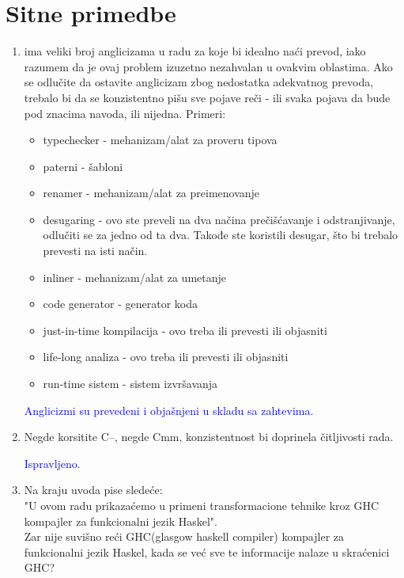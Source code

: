 \documentclass[a4paper]{report}
\newcommand{\odgovor}[1]{\textcolor{blue}{#1}}
\begin{document}
	\section{Sitne primedbe}
	\begin{enumerate}
		\item ima veliki broj anglicizama u radu za koje bi idealno naći prevod, iako razumem da je ovaj problem izuzetno nezahvalan u ovakvim oblastima. Ako se odlučite da ostavite anglicizam zbog nedostatka adekvatnog prevoda, trebalo bi da se konzistentno pišu sve pojave reči - ili svaka pojava da bude pod znacima navoda, ili nijedna. Primeri:
		\begin{itemize}
			\item typechecker - mehanizam/alat za proveru tipova
			\item paterni - šabloni
			\item renamer - mehanizam/alat za preimenovanje
			\item desugaring - ovo ste preveli na dva načina prečišćavanje i odstranjivanje, odlučiti se za jedno od ta dva. Takođe ste koristili desugar, što bi trebalo prevesti na isti način.
			\item inliner - mehanizam/alat za umetanje
			\item code generator - generator koda
			\item just-in-time kompilacija - ovo treba ili prevesti ili objasniti
			\item life-long analiza - ovo treba ili prevesti ili objasniti
			\item run-time sistem - sistem izvršavanja
		\end{itemize}
		
		\odgovor{Anglicizmi su prevedeni i objašnjeni u skladu sa zahtevima.}
		
		\item Negde korsitite C--, negde Cmm, konzistentnost bi doprinela čitljivosti rada.
		
		\odgovor{Ispravljeno.}
		
		\item Na kraju uvoda pise sledeće:\\
		"U ovom radu prikazaćemo u primeni transformacione tehnike kroz GHC
		kompajler za funkcionalni jezik Haskel".\\
		Zar nije suvišno reći GHC(glasgow haskell compiler) kompajler za funkcionalni jezik Haskel, kada se već sve te informacije nalaze u skraćenici GHC?
		

\end{enumerate}
\end{document}
